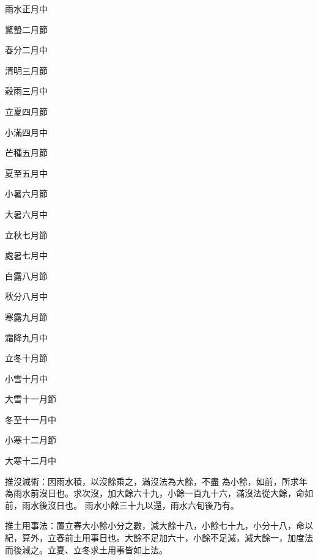 \begin{pinyinscope}
雨水正月中


驚蟄二月節


春分二月中


清明三月節


穀雨三月中


立夏四月節


小滿四月中


芒種五月節


夏至五月中


小暑六月節


大暑六月中


立秋七月節


處暑七月中


白露八月節


秋分八月中


寒露九月節


霜降九月中


立冬十月節


小雪十月中


大雪十一月節


冬至十一月中


小寒十二月節


大寒十二月中


推沒滅術：因雨水積，以沒餘乘之，滿沒法為大餘，不盡
 為小餘，如前，所求年為雨水前沒日也。求次沒，加大餘六十九，小餘一百九十六，滿沒法從大餘，命如前，雨水後沒日也。
 雨水小餘三十九以還，雨水六旬後乃有。



 推土用事法：置立春大小餘小分之數，減大餘十八，小餘七十九，小分十八，命以紀，算外，立春前土用事日也。大餘不足加六十，小餘不足減，減大餘一，加度法而後減之。立夏、立冬求土用事皆如上法。




\end{pinyinscope}
